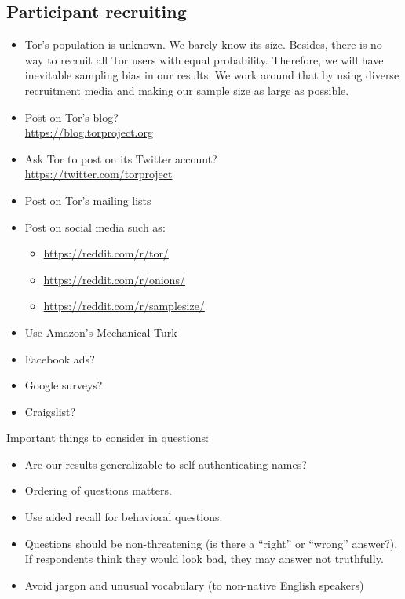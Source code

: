 \subsection{Participant recruiting}
\begin{itemize}
    \item Tor's population is unknown.  We barely know its size.  Besides, there
        is no way to recruit all Tor users with equal probability.  Therefore,
        we will have inevitable sampling bias in our results.  We work around
        that by using diverse recruitment media and making our sample size as
        large as possible.
    \item Post on Tor's blog?\\\url{https://blog.torproject.org}
    \item Ask Tor to post on its Twitter account?\\\url{https://twitter.com/torproject}
    \item Post on Tor's mailing lists
    \item Post on social media such as:
        \begin{itemize}
            \item \url{https://reddit.com/r/tor/}
            \item \url{https://reddit.com/r/onions/}
            \item \url{https://reddit.com/r/samplesize/}
        \end{itemize}
    \item Use Amazon's Mechanical Turk
    \item Facebook ads?
    \item Google surveys?
    \item Craigslist?
\end{itemize}

Important things to consider in questions:
\begin{itemize}
    \item Are our results generalizable to self-authenticating names?
    \item Ordering of questions matters.
    \item Use aided recall for behavioral questions.
    \item Questions should be non-threatening (is there a ``right'' or ``wrong''
        answer?).  If respondents think they would
        look bad, they may answer not truthfully.
    \item Avoid jargon and unusual vocabulary (to non-native English speakers)
\end{itemize}

